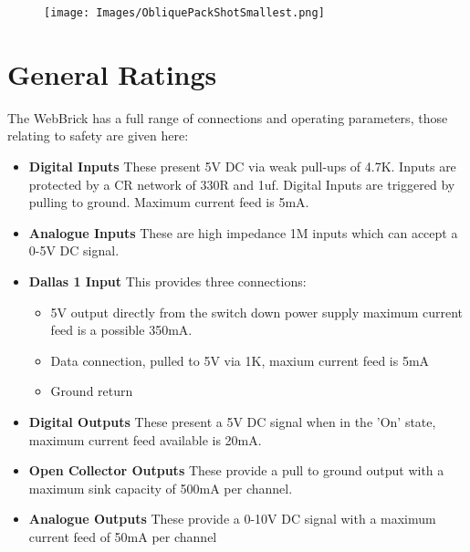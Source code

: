 \documentclass[a4paper,12pt]{article}
\begin{document}
	\begin{figure}[H]
	\centering
	\texttt{[image: Images/ObliquePackShotSmallest.png]}
	\end{figure}

	
	
\section{General Ratings}

The WebBrick has a full range of connections and operating parameters, those relating to safety are given here:

	\begin{itemize}

		\item{\textbf{Digital Inputs}}  These present 5V DC via weak pull-ups of 4.7K.  Inputs are protected by a CR network
		of 330R and 1uf.  Digital Inputs are triggered by pulling to ground.  Maximum current feed is 5mA.

		\item{\textbf{Analogue Inputs}}  These are high impedance 1M inputs which can accept a 0-5V DC signal.

		\item{\textbf{Dallas 1 Input}}  This provides three connections: 

			\begin{itemize}
		
				\item{} 5V output directly from the switch down power supply maximum 
				current feed is a possible 350mA.
			
				\item{} Data connection, pulled to 5V via 1K, maxium current feed is 5mA
			
				\item{} Ground return
		
			\end{itemize}

		\item{\textbf{Digital Outputs}}  These present a 5V DC signal when in the 'On' state, maximum current feed available is 20mA.
		
		\item{\textbf{Open Collector Outputs}}  These provide a pull to ground output with a maximum sink capacity of 500mA per channel.
		
		\item{\textbf{Analogue Outputs}}  These provide a 0-10V DC signal with a maximum current feed of 50mA per channel
		

\end{itemize}
\end{document}
